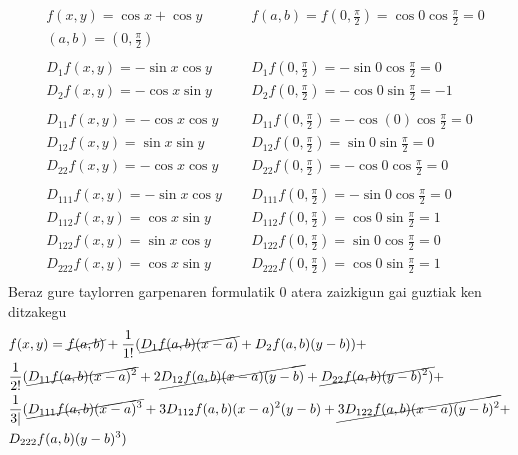 \begin{equation*}
    \begin{array}{lll}
    & f(x,y)=\cos{x}+\cos{y}\qquad &f(a,b)=f(0,\frac{\pi}{2})=\cos{0}\cos{\frac{\pi}{2}}=0\\
    &(a,b)=(0,\frac{\pi}{2})&\\
    \\
    & D_1f(x,y)=-\sin{x}\cos{y}\qquad & D_1f(0,\frac{\pi}{2})=-\sin{0}\cos{\frac{\pi}{2}}=0 \\
    & D_2f(x,y)=-\cos{x}\sin{y}& D_2f(0,\frac{\pi}{2})=-\cos{0}\sin{\frac{\pi}{2}=-1}\\
    \\
    & D_{11}f(x,y)=-\cos{x}\cos{y}& D_{11}f(0,\frac{\pi}{2})=-\cos(0)\cos{\frac{\pi}{2}}=0\\
    
    & D_{12}f(x,y)=\sin{x}\sin{y} &D_{12}f(0,\frac{\pi}{2})=\sin{0}\sin{\frac{\pi}{2}}=0\\
    
    &D_{22}f(x,y)=-\cos{x}\cos{y}&D_{22}f(0,\frac{\pi}{2})=-\cos{0}\cos{\frac{\pi}{2}}=0\\
    \\
    &D_{111}f(x,y)=-\sin{x}\cos{y}&D_{111}f(0,\frac{\pi}{2})=-\sin{0}\cos{\frac{\pi}{2}}=0\\
    
    &D_{112}f(x,y)=\cos{x}\sin{y}&D_{112}f(0,\frac{\pi}{2})=\cos{0}\sin{\frac{\pi}{2}}=1\\
    
    &D_{122}f(x,y)=\sin{x}\cos{y}&D_{122}f(0,\frac{\pi}{2})=\sin{0}\cos{\frac{\pi}{2}}=0\\
    
    &D_{222}f(x,y)=\cos{x}\sin{y}&D_{222}f(0,\frac{\pi}{2})=\cos{0}\sin{\frac{\pi}{2}}=1\\
    \end{array}
\end{equation*}
Beraz gure taylorren garpenaren formulatik 0 atera zaizkigun gai guztiak ken ditzakegu
\begin{equation*}
\begin{split}
    &f(x,y)=\cancel{f(a,b)}+\frac{1}{1!}(\cancel{D_1f(a,b)(x-a)}+D_2f(a,b)(y-b))+\\
    &\frac{1}{2!}(\cancel{D_{11}f(a,b)(x-a)^2} +2 \cancel{D_{12}f(a,b)(x-a)(y-b)}+\cancel{D_{22}f(a,b)(y-b)^2)}+\\
    &\frac{1}{3|}(\cancel{D_{111}f(a,b)(x-a)^3}+3D_{112}f(a,b)(x-a)^2(y-b)+\cancel{3D_{122}f(a,b)(x-a)(y-b)^2}+\\
    &D_{222}f(a,b)(y-b)^3)
\end{split}
\end{equation*}

